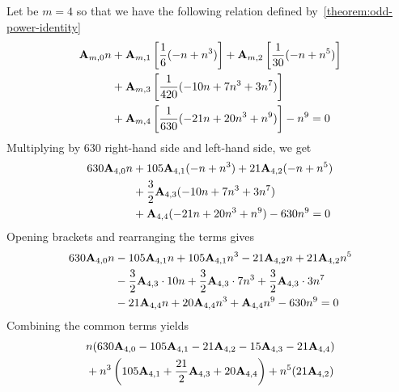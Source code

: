 \begin{example}
    Let be $m=4$ so that we have the following relation defined by~\eqref{theorem:odd-power-identity}
    \begin{equation*}
        \begin{split}
            {\mathbf{A}} \sb{m,0} n
            &+ {\mathbf{A}} \sb{m,1} \left[ \frac{1}{6} (-n + n^3) \right]
            + {\mathbf{A}} \sb{m,2} \left[ \frac{1}{30} (-n + n^5) \right] \\
            &+ {\mathbf{A}} \sb{m,3} \left[ \frac{1}{420} (-10 n + 7 n^3 + 3 n^7) \right] \\
            &+ {\mathbf{A}} \sb{m,4} \left[ \frac{1}{630} (-21 n + 20 n^3 + n^9) \right] - n^9 = 0
        \end{split}
    \end{equation*}
    Multiplying by $630$ right-hand side and left-hand side, we get
    \begin{equation*}
        \begin{split}
            630 {\mathbf{A}} \sb{4,0} n
            &+ 105 {\mathbf{A}} \sb{4,1} (-n + n^3) + 21 {\mathbf{A}} \sb{4,2} (-n + n^5) \\
            &+ \frac{3}{2} {\mathbf{A}} \sb{4,3} (-10 n + 7 n^3 + 3 n^7) \\
            &+ {\mathbf{A}} \sb{4,4} (-21 n + 20 n^3 + n^9) - 630 n^9 = 0
        \end{split}
    \end{equation*}
    Opening brackets and rearranging the terms gives
    \begin{equation*}
        \begin{split}
            630 {\mathbf{A}} \sb{4,0} n
            &- 105 {\mathbf{A}} \sb{4,1} n + 105 {\mathbf{A}} \sb{4,1} n ^3 - 21 {\mathbf{A}} \sb{4,2} n + 21 {\mathbf{A}} \sb{4,2} n^5 \\
            &- \frac{3}{2} {\mathbf{A}} \sb{4,3} \cdot 10n + \frac{3}{2} {\mathbf{A}} \sb{4,3} \cdot 7n^3 + \frac{3}{2} {\mathbf{A}} \sb{4,3} \cdot 3n^7 \\
            &-21 {\mathbf{A}} \sb{4,4} n + 20 {\mathbf{A}} \sb{4,4} n^3 + {\mathbf{A}} \sb{4,4} n ^9 - 630 n^9 = 0
        \end{split}
    \end{equation*}
    Combining the common terms yields
    \begin{equation*}
        \begin{split}
            &n (630 \coeffA{4}{0} - 105 \coeffA{4}{1} - 21 \coeffA{4}{2} - 15 \coeffA{4}{3} - 21 \coeffA{4}{4})  \\
            &+ n^3 \left( 105 \coeffA{4}{1} + \frac{21}{2} \coeffA{4}{3} + 20 \coeffA{4}{4} \right) + n^5 (21 \coeffA{4}{2}) \\

\end{split}
\end{equation*}
\end{example}
